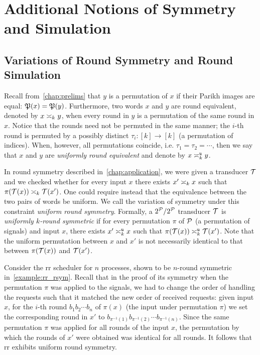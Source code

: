 \chapter{Additional Notions of Symmetry and Simulation}
\label{chap:other_notions}

\section{Variations of Round Symmetry and Round Simulation}
\label{sec:variations_rs}
\newcommand{\RSTYPES}{\ensuremath{\mathbf{MOP}}}
\newcommand{\RSTUPS}{\ensuremath{\mathbf{MOP}^2_k}}
\newcommand{\rstype}[1]{\mathtt{#1}}
\newcommand{\reqtype}[2][]{\req[#1]^{\rstype{#2}}}
\newcommand{\prectype}[2]{\prec^{\rstype{#1}, \rstype{#2}}}

Recall from~\cref{chap:prelims} that $y$ is a permutation of $x$ if their Parikh images are equal: $\fP(x)=\fP(y)$. Furthermore, two words $x$ and $y$ are round equivalent, denoted by $x\req[k] y$, when every round in $y$ is a permutation of the same round in $x$. Notice that the rounds need not be permuted in the same manner; the $i$-th round is permuted by a possibly distinct $\tau_i: [k]\rightarrow [k]$ (a permutation of indices). When, however, all permutations coincide, i.e. $\tau_1=\tau_2=\cdots$, then we say that $x$ and $y$ are \emph{uniformly round equivalent} and denote by $x\reqtype[k]{u} y$.

In round symmetry described in~\cref{chap:application}, we were given a transducer $\cT$ and we checked whether for every input $x$ there exists $x'\req[k] x$ such that $\pi(\cT(x))\req[k] \cT(x')$. One could require instead that the equivalence between the two pairs of words be uniform. We call the variation of symmetry under this constraint \emph{uniform round symmetry}. Formally, a $2^\cP/2^\cP$ transducer $\cT$ is \emph{uniformly $k$-round symmetric} if for every permutation $\pi$ of $\cP$ (a permutation of signals) and input $x$, there exists $x'\reqtype[k]{u} x$ such that $\pi(\cT(x))\reqtype[k]{u} \cT(x')$.
Note that the uniform permutation between $x$ and $x'$ is not necessarily identical to that between $\pi(\cT(x))$ and $\cT(x')$.

\begin{example}
Consider the \gls{rr} scheduler for $n$ processes, shown to be $n$-round symmetric in~\cref{example:rr_rsym}. Recall that in the proof of its symmetry when the permutation $\pi$ was applied to the signals, we had to change the order of handling the requests such that it matched the new order of received requests: given input $x$, for the $i$-th round $b_1 b_2\cdots b_n$ of $\pi(x)$ (the input under permutation $\pi$) we set the corresponding round in $x'$ to $b_{\pi^{-1}(1)} b_{\pi^{-1}(2)} \cdots b_{\pi^{-1}(n)}$. Since the same permutation $\pi$ was applied for all rounds of the input $x$, the permutation by which the rounds of $x'$ were obtained was identical for all rounds. It follows that \gls{rr} exhibits uniform round symmetry.
\end{example}

